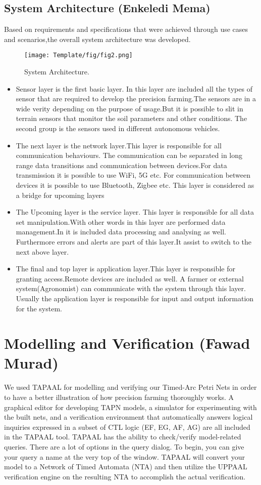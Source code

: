 \documentclass[english]{lni}
\begin{document}
\subsection{ System Architecture (Enkeledi Mema)}
Based on requirements and specifications that were achieved through use cases and scenarios,the overall system architecture was developed.
\begin{figure}[h]
    \texttt{[image: Template/fig/fig2.png]}
    \centering
    \caption{ System Architecture.}
\end{figure} 
\begin{itemize}
    \item Sensor layer is  the first basic layer. In this layer are included all the types of sensor that are required to develop the precision farming.The sensors are in a wide verity depending on the purpose of usage.But it is possible to slit in terrain sensors that monitor the soil parameters and other conditions. The second group is the sensors used in different autonomous vehicles.
    \item The next layer is the network layer.This layer is responsible for all communication behaviours. The communication can be separated in long range data transitions and communication between devices.For data transmission it is possible to use WiFi, 5G etc. For communication between devices it is possible to use Bluetooth, Zigbee etc. This layer is considered as a bridge for upcoming layers
    \item The Upcoming layer is the service layer. This layer is responsible for all data set manipulation.With other words  in this layer are performed data management.In it is included data processing and analysing as well. Furthermore errors and alerts are part of this layer.It assist to switch to the next above layer. 
    \item The final and top layer is application layer.This layer is responsible for granting access.Remote devices are included as well. A farmer or external system(Agronomist) can communicate with the system through this layer. Usually the application layer is responsible for input and output information for the system.
\end{itemize} 

\section{Modelling and Verification  (Fawad Murad)}

We used TAPAAL for modelling and verifying our Timed-Arc Petri Nets in order to have a better illustration of how precision farming thoroughly works. 
A graphical editor for developing TAPN models, a simulator for experimenting with the built nets, and a verification environment that automatically answers logical inquiries expressed in a subset of CTL logic (EF, EG, AF, AG) are all included in the TAPAAL tool. TAPAAL has the ability to check/verify model-related queries. There are a lot of options in the query dialog. To begin, you can give your query a name at the very top of the window. TAPAAL will convert your model to a Network of Timed Automata (NTA) and then utilize the UPPAAL verification engine on the resulting NTA to accomplish the actual verification. 
\end{document}
